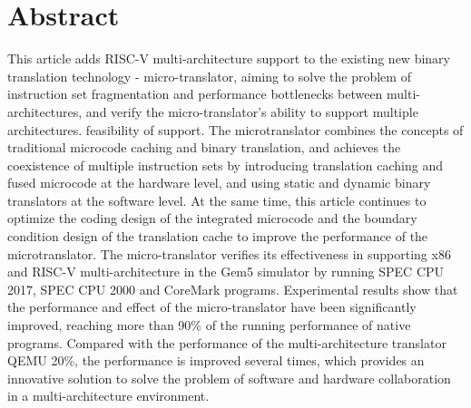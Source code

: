 \intobmk\chapter*{Abstract}%

This article adds RISC-V multi-architecture support to the existing new binary translation technology - micro-translator, aiming to solve the problem of instruction set fragmentation and performance bottlenecks between multi-architectures, and verify the micro-translator's ability to support multiple architectures. feasibility of support.
The microtranslator combines the concepts of traditional microcode caching and binary translation, and achieves the coexistence of multiple instruction sets by introducing translation caching and fused microcode at the hardware level, and using static and dynamic binary translators at the software level.
At the same time, this article continues to optimize the coding design of the integrated microcode and the boundary condition design of the translation cache to improve the performance of the microtranslator.
The micro-translator verifies its effectiveness in supporting x86 and RISC-V multi-architecture in the Gem5 simulator by running SPEC CPU 2017, SPEC CPU 2000 and CoreMark programs.
Experimental results show that the performance and effect of the micro-translator have been significantly improved, reaching more than 90\% of the running performance of native programs.
Compared with the performance of the multi-architecture translator QEMU 20\%, the performance is improved several times, which provides an innovative solution to solve the problem of software and hardware collaboration in a multi-architecture environment.


